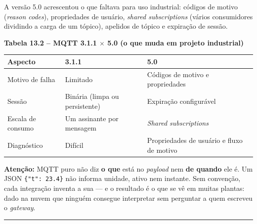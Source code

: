 A versão 5.0 acrescentou o que faltava para uso industrial: códigos de motivo (\emph{reason codes}), propriedades de usuário, \emph{shared subscriptions} (vários consumidores dividindo a carga de um tópico), apelidos de tópico e expiração de sessão.

\textbf{Tabela 13.2 -- MQTT 3.1.1 \ensuremath{\times} 5.0 (o que muda em projeto industrial)}

\begin{longtable}[]{@{}
  >{\raggedright\arraybackslash}p{}
  >{\raggedright\arraybackslash}p{}
  >{\raggedright\arraybackslash}p{}@{}}
\toprule\noalign{}
\begin{minipage}[b]{\linewidth}\raggedright
Aspecto
\end{minipage} & \begin{minipage}[b]{\linewidth}\raggedright
3.1.1
\end{minipage} & \begin{minipage}[b]{\linewidth}\raggedright
5.0
\end{minipage} \\
\midrule\noalign{}
\endhead
\bottomrule\noalign{}
\endlastfoot
Motivo de falha & Limitado & Códigos de motivo e propriedades \\
Sessão & Binária (limpa ou persistente) & Expiração configurável \\
Escala de consumo & Um assinante por mensagem & \emph{Shared subscriptions} \\
Diagnóstico & Difícil & Propriedades de usuário e fluxo de motivo \\
\end{longtable}

\begin{caixaatencao}

\textbf{Atenção:} MQTT puro não diz \textbf{o que} está no \emph{payload} nem \textbf{de quando} ele é. Um JSON \passthrough{\lstinline!\{"t": 23.4\}!} não informa unidade, ativo nem instante. Sem convenção, cada integração inventa a sua --- e o resultado é o que se vê em muitas plantas: dado na nuvem que ninguém consegue interpretar sem perguntar a quem escreveu o \emph{gateway}.

\end{caixaatencao}

\begin{center}\rule{0.5\linewidth}{0.5pt}\end{center}

